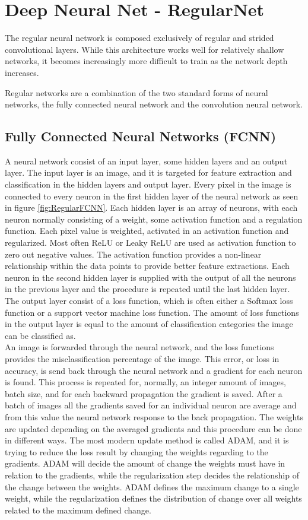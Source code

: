\section{Deep Neural Net - RegularNet}
The regular neural network is composed exclusively of regular and strided convolutional layers. While this architecture works well for relatively shallow networks, it becomes increasingly more difficult to train as the network depth increases.

Regular networks are a combination of the two standard forms of neural networks, the fully connected neural network and the convolution neural network.

\subsection{Fully Connected Neural Networks (FCNN)}
A neural network consist of an input layer, some hidden layers and an output layer. The input layer is an image, and it is targeted for feature extraction and classification in the hidden layers and output layer. Every pixel in the image is connected to every neuron in the first hidden layer of the neural network as seen in figure \ref{fig:RegularFCNN}.    
Each hidden layer is an array of neurons, with each neuron normally consisting of a weight, some activation function and a regulation function. Each pixel value is weighted, activated in an activation function and regularized. Most often ReLU or Leaky ReLU are used as activation function to zero out negative values. The activation function provides a non-linear relationship within the data points to provide better feature extractions. Each neuron in the second hidden layer is supplied with the output of all the neurons in the previous layer and the procedure is repeated until the last hidden layer. The output layer consist of a loss function, which is often either a Softmax loss function or a support vector machine loss function. The amount of loss functions in the output layer is equal to the amount of classification categories the image can be classified as.
\\
An image is forwarded through the neural network, and the loss functions provides the misclassification percentage of the image. This error, or loss in accuracy, is send back through the neural network and a gradient for each neuron is found. This process is repeated for, normally, an integer amount of images, batch size, and for each backward propagation the gradient is saved. After a batch of images all the gradients saved for an individual neuron are average and from this value the neural network response to the back propagation. The weights are updated depending on the averaged gradients and this procedure can be done in different ways. The most modern update method is called ADAM, and it is trying to reduce the loss result by changing the weights regarding to the gradients. ADAM will decide the amount of change the weights must have in relation to the gradients, while the regularization step decides the relationship of the change between the weights. ADAM defines the maximum change to a single weight, while the regularization defines the distribution of change over all weights related to the maximum defined change.

